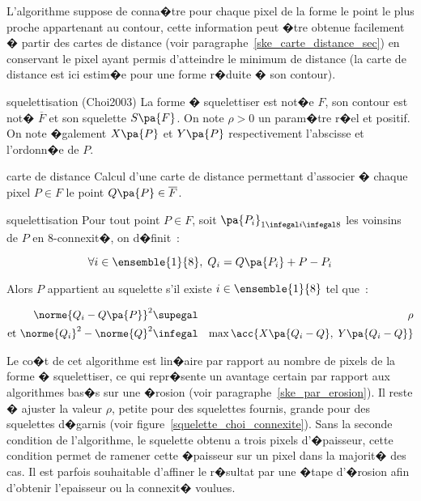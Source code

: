 
L'algorithme suppose de conna�tre pour chaque pixel de la forme le point le plus proche appartenant au contour, cette information peut �tre obtenue facilement � partir des cartes de distance (voir paragraphe~\ref{ske_carte_distance_sec}) en conservant le pixel ayant permis d'atteindre le minimum de distance (la carte de distance est ici estim�e pour une forme r�duite � son contour).

        \begin{xalgorithm}{squelettisation (Choi2003)}
        La forme � squelettiser est not�e $F$, son contour est not� $\overline{F}$ et son squelette $S\pa{F}$. 
        On note $\rho > 0$ un param�tre r�el et positif. On note �galement $X\pa{P}$ et $Y\pa{P}$ 
        respectivement l'abscisse et l'ordonn�e de $P$.
        
        \begin{xalgostep}{carte de distance}
        Calcul d'une carte de distance permettant d'associer � chaque pixel $P \in F$ 
        le point $Q\pa{P} \in \overline{F}$.
        \end{xalgostep}
        
        \begin{xalgostep}{squelettisation}
        Pour tout point $P \in F$, soit $\pa{P_i}_{1 \infegal i \infegal 8}$ les voinsins de $P$ 
        en 8-connexit�, on d�finit~:
        
                $$
                \forall i \in \ensemble{1}{8}, \; Q_i = Q\pa{P_i} + P - P_i
                $$
                
        Alors $P$ appartient au squelette s'il existe $i \in \ensemble{1}{8}$ tel que~:
        
                \begin{eqnarray}
                \norme{Q_i - Q\pa{P}}^2         &\supegal& \rho  \label{squelette_choi_condition_1}\\
                \text{et } \norme{Q_i}^2 - \norme{Q}^2    &\infegal& \max \acc{ X\pa{Q_i - Q}, \; Y\pa{Q_i - Q}}
                \end{eqnarray}
                
        \end{xalgostep}
        \end{xalgorithm}


Le co�t de cet algorithme est lin�aire par rapport au nombre de pixels de la forme � squelettiser, ce qui repr�sente un avantage certain par rapport aux algorithmes bas�s sur une �rosion (voir paragraphe~\ref{ske_par_erosion}). Il reste � ajuster la valeur $\rho$, petite pour des squelettes fournis, grande pour des squelettes d�garnis (voir figure~\ref{squelette_choi_connexite}). Sans la seconde condition de l'algorithme, le squelette obtenu a trois pixels d'�paisseur, cette condition permet de ramener cette �paisseur sur un pixel dans la majorit� des cas. Il est parfois souhaitable d'affiner le r�sultat par une �tape d'�rosion afin d'obtenir l'epaisseur ou la connexit� voulues.




